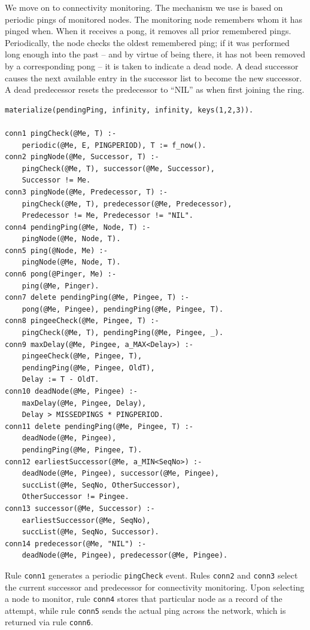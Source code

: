 \documentclass{article}
\begin{document}
We move on to connectivity monitoring. The mechanism we use is based on
periodic pings of monitored nodes.  The monitoring node remembers whom
it has pinged when. When it receives a pong, it removes all prior
remembered pings. Periodically, the node checks the oldest remembered
ping; if it was performed long enough into the past -- and by virtue of
being there, it has not been removed by a corresponding pong -- it is
taken to indicate a dead node. A dead successor causes the next
available entry in the successor list to become the new successor. A
dead predecessor resets the predecessor to ``NIL'' as when first joining
the ring.

\begin{lstlisting}
materialize(pendingPing, infinity, infinity, keys(1,2,3)).

conn1 pingCheck(@Me, T) :-
	periodic(@Me, E, PINGPERIOD), T := f_now().
conn2 pingNode(@Me, Successor, T) :-
	pingCheck(@Me, T), successor(@Me, Successor),
	Successor != Me.
conn3 pingNode(@Me, Predecessor, T) :-
	pingCheck(@Me, T), predecessor(@Me, Predecessor),
	Predecessor != Me, Predecessor != "NIL".
conn4 pendingPing(@Me, Node, T) :-
	pingNode(@Me, Node, T).
conn5 ping(@Node, Me) :-
	pingNode(@Me, Node, T).
conn6 pong(@Pinger, Me) :-
	ping(@Me, Pinger).
conn7 delete pendingPing(@Me, Pingee, T) :-
	pong(@Me, Pingee), pendingPing(@Me, Pingee, T).
conn8 pingeeCheck(@Me, Pingee, T) :-
	pingCheck(@Me, T), pendingPing(@Me, Pingee, _).
conn9 maxDelay(@Me, Pingee, a_MAX<Delay>) :-
	pingeeCheck(@Me, Pingee, T),
	pendingPing(@Me, Pingee, OldT),
	Delay := T - OldT.
conn10 deadNode(@Me, Pingee) :-
	maxDelay(@Me, Pingee, Delay),
	Delay > MISSEDPINGS * PINGPERIOD.
conn11 delete pendingPing(@Me, Pingee, T) :-
	deadNode(@Me, Pingee),
	pendingPing(@Me, Pingee, T).
conn12 earliestSuccessor(@Me, a_MIN<SeqNo>) :-
	deadNode(@Me, Pingee), successor(@Me, Pingee),
	succList(@Me, SeqNo, OtherSuccessor),
	OtherSuccessor != Pingee.
conn13 successor(@Me, Successor) :-
	earliestSuccessor(@Me, SeqNo),
	succList(@Me, SeqNo, Successor).
conn14 predecessor(@Me, "NIL") :-
	deadNode(@Me, Pingee), predecessor(@Me, Pingee).
\end{lstlisting}

Rule \lstinline$conn1$ generates a periodic \lstinline$pingCheck$
event. Rules \lstinline$conn2$ and \lstinline$conn3$ select the current
successor and predecessor for connectivity monitoring.  Upon selecting a
node to monitor, rule \lstinline$conn4$ stores that particular node as a
record of the attempt, while rule \lstinline$conn5$ sends the actual
ping across the network, which is returned via rule \lstinline$conn6$.
\end{document}
